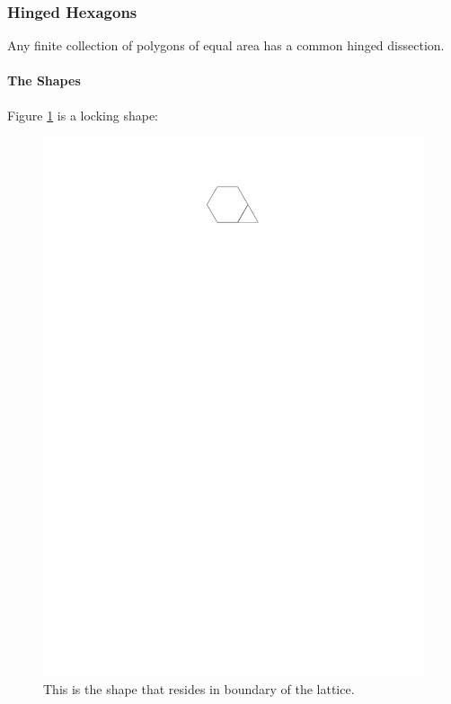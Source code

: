 \subsubsection{Hinged Hexagons}
\begin{thm}[]\label{thm}
Any finite collection of polygons of equal area has a common hinged dissection.
\cite{abbott2012hinged}
\end{thm}
\paragraph{The Shapes}
Figure \ref{fig:lockingShape} is a locking shape:
\begin{figure}[h]
\begin{center}
\includegraphics{graphics/lockingShape.pdf}
\caption{This is the shape that resides in boundary of the lattice.}
\label{fig:lockingShape}
\end{center}
\end{figure}
